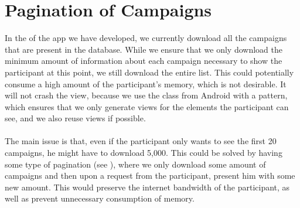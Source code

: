 
\section{Pagination of Campaigns}
\label{sec:pagination_of_campaigns}

In the  of the app we have developed, we currently download all the campaigns that are present in the database. While we ensure that we only download the minimum amount of information about each campaign necessary to show the participant at this point, we still download the entire list. This could potentially consume a high amount of the participant's memory, which is not desirable. It will not crash the view, because we use the  class from Android with a  pattern, which ensures that we only generate views for the elements the participant can see, and we also reuse views if possible.
\\\\
The main issue is that, even if the participant only wants to see the first 20 campaigns, he might have to download 5,000. This could be solved by having some type of pagination (see ), where we only download some amount of campaigns and then upon a request from the participant, present him with some new amount. This would preserve the internet bandwidth of the participant, as well as prevent unnecessary consumption of memory.